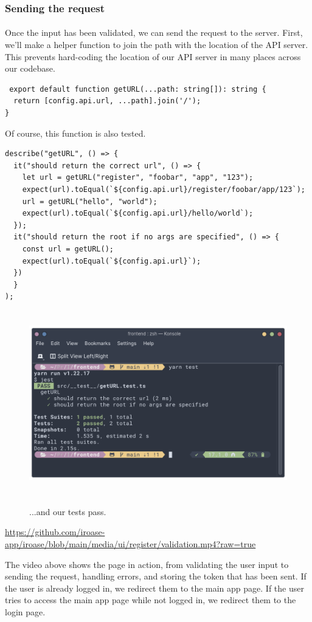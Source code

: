 \documentclass{report}
\begin{document}
\subsubsection{Sending the request}
\paragraph{}
Once the input has been validated, we can send the request to the server. First, we'll make a helper function to join the path with the location of the API server. This prevents hard-coding the location of our API server in many places across our codebase.

\begin{verbatim}
 export default function getURL(...path: string[]): string {
  return [config.api.url, ...path].join('/');
}
\end{verbatim}
Of course, this function is also tested.
\begin{verbatim}
describe("getURL", () => {
  it("should return the correct url", () => {
    let url = getURL("register", "foobar", "app", "123");
    expect(url).toEqual(`${config.api.url}/register/foobar/app/123`);
    url = getURL("hello", "world");
    expect(url).toEqual(`${config.api.url}/hello/world`);
  });
  it("should return the root if no args are specified", () => {
    const url = getURL();
    expect(url).toEqual(`${config.api.url}`);
  })
  }
);
\end{verbatim}
\begin{figure}[H]
  \centering
  \includegraphics[height=8cm]{./media/development/frontend/tests/unit/getURL.png}
  \label{fig:getURL1}
  \caption{...and our tests pass.}
\end{figure}
\href{https://github.com/iroase-app/iroase/blob/main/media/ui/register/validation.mp4?raw=true}{https://github.com/iroase-app/iroase/blob/main/media/ui/register/validation.mp4?raw=true}

The video above shows the page in action, from validating the user input to sending the request, handling errors, and storing the token that has been sent. If the user is already logged in, we redirect them to the main app page. If the user tries to access the main app page while not logged in, we redirect them to the login page.

\printbibliography
\end{document}
